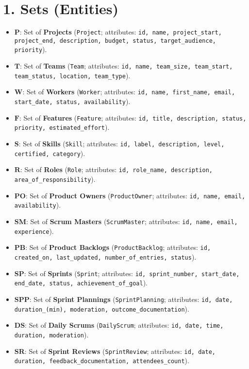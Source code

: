 \documentclass[11pt,a4paper]{article}
\begin{document}
\section{1. Sets (Entities)}
\begin{itemize}[leftmargin=2em,label=\(\triangleright\)]
  \item \(\mathbf{P}\): Set of \textbf{Projects} (\texttt{Project}; attributes: \texttt{id, name, project\_start, project\_end, description, budget, status, target\_audience, priority}).
  \item \(\mathbf{T}\): Set of \textbf{Teams} (\texttt{Team}; attributes: \texttt{id, name, team\_size, team\_start, team\_status, location, team\_type}).
  \item \(\mathbf{W}\): Set of \textbf{Workers} (\texttt{Worker}; attributes: \texttt{id, name, first\_name, email, start\_date, status, availability}).
  \item \(\mathbf{F}\): Set of \textbf{Features} (\texttt{Feature}; attributes: \texttt{id, title, description, status, priority, estimated\_effort}).
  \item \(\mathbf{S}\): Set of \textbf{Skills} (\texttt{Skill}; attributes: \texttt{id, label, description, level, certified, category}).
  \item \(\mathbf{R}\): Set of \textbf{Roles} (\texttt{Role}; attributes: \texttt{id, role\_name, description, area\_of\_responsibility}).
  \item \(\mathbf{PO}\): Set of \textbf{Product Owners} (\texttt{ProductOwner}; attributes: \texttt{id, name, email, availability}).
  \item \(\mathbf{SM}\): Set of \textbf{Scrum Masters} (\texttt{ScrumMaster}; attributes: \texttt{id, name, email, experience}).
  \item \(\mathbf{PB}\): Set of \textbf{Product Backlogs} (\texttt{ProductBacklog}; attributes: \texttt{id, created\_on, last\_updated, number\_of\_entries, status}).
  \item \(\mathbf{SP}\): Set of \textbf{Sprints} (\texttt{Sprint}; attributes: \texttt{id, sprint\_number, start\_date, end\_date, status, achievement\_of\_goal}).
  \item \(\mathbf{SPP}\): Set of \textbf{Sprint Plannings} (\texttt{SprintPlanning}; attributes: \texttt{id, date, duration\_(min), moderation, outcome\_documentation}).
  \item \(\mathbf{DS}\): Set of \textbf{Daily Scrums} (\texttt{DailyScrum}; attributes: \texttt{id, date, time, duration, moderation}).
  \item \(\mathbf{SR}\): Set of \textbf{Sprint Reviews} (\texttt{SprintReview}; attributes: \texttt{id, date, duration, feedback\_documentation, attendees\_count}).

\end{itemize}
\end{document}
